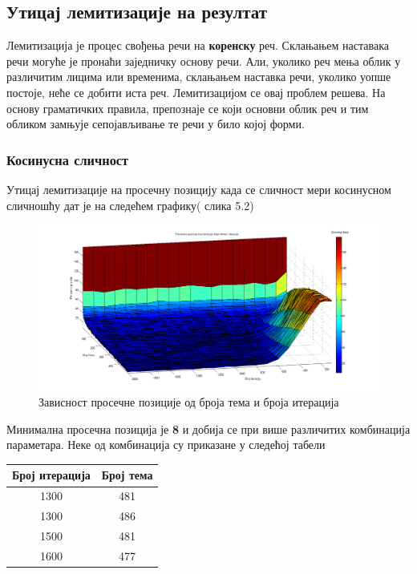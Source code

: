 \subsection{Утицај лемитизације на резултат}

Лемитизација је процес свођења речи на \textbf{коренску} реч. Склањањем наставака речи могуће је пронаћи заједничку основу речи. Али, уколико реч мења облик у различитим лицима или временима, склањањем наставка речи, уколико уопше постоје, неће се добити иста реч. Лемитизацијом се овај проблем решева. На основу граматичких правила, препознаје се који основни облик реч и тим обликом замњује сепојављивање те речи у било којој форми. 




\subsubsection{Косинусна сличност}



Утицај лемитизације на просечну позицију  када се сличност мери косинусном сличношћу дат је на следећем графику( слика 5.2)

		\begin{figure}[H]
    \centering
   \includegraphics[scale=0.3]{./Slike/LemmNoSyn.png} 
	\caption{Зависност просечне позиције од броја тема и броја итерација}
	\label{fig:slika1}
\end{figure}

Минимална просечна позиција је \textbf{8} и добија се при више различитих комбинација параметара. Неке од комбинација су приказане у следећој табели

\begin{center}
\begin{tabular}{|c|c|}
\hline
Број итерација & Број тема \\
\hline\hline
1300 & 481 \\
1300 & 486 \\
1500 & 481 \\
1600 & 477 \\
\hline
\end{tabular}
\end{center}

